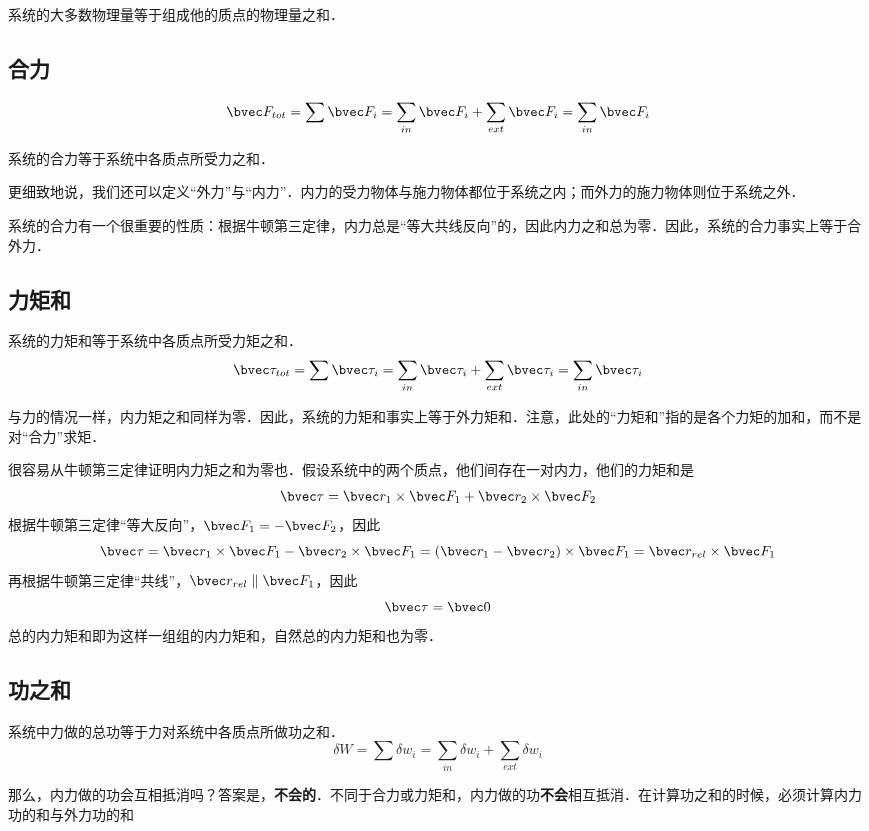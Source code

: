

系统的大多数物理量等于组成他的质点的物理量之和．
\subsection{合力}
\begin{equation}
\bvec F_{tot}=\sum \bvec F_i=\sum_{in} \bvec F_i + \sum_{ext} \bvec F_i = \sum_{in} \bvec F_i
\end{equation}

系统的合力等于系统中各质点所受力之和．

更细致地说，我们还可以定义“外力”与“内力”．内力的受力物体与施力物体都位于系统之内；而外力的施力物体则位于系统之外．

系统的合力有一个很重要的性质：根据牛顿第三定律，内力总是“等大共线反向”的，因此内力之和总为零．因此，系统的合力事实上等于合外力．

\subsection{力矩和}
系统的力矩和等于系统中各质点所受力矩之和．
\begin{equation}
\bvec \tau_{tot}=\sum \bvec \tau_i=\sum_{in} \bvec \tau_i + \sum_{ext} \bvec \tau_i = \sum_{in} \bvec \tau_i
\end{equation}

与力的情况一样，内力矩之和同样为零．因此，系统的力矩和事实上等于外力矩和．注意，此处的“力矩和”指的是各个力矩的加和，而不是对“合力”求矩．

很容易从牛顿第三定律证明内力矩之和为零也．假设系统中的两个质点，他们间存在一对内力，他们的力矩和是
$$\bvec \tau = \bvec r_1 \times \bvec F_1 + \bvec r_2 \times \bvec F_2$$
根据牛顿第三定律“等大反向”，$\bvec F_1=-\bvec F_2$，因此
$$\bvec \tau = \bvec r_1 \times \bvec F_1 - \bvec r_2 \times \bvec F_1 = (\bvec r_1 - \bvec r_2) \times \bvec F_1 = \bvec r_{rel}\times \bvec F_1$$
再根据牛顿第三定律“共线”，$\bvec r_{rel} \parallel \bvec F_1 $，因此
$$\bvec \tau = \bvec 0$$
总的内力矩和即为这样一组组的内力矩和，自然总的内力矩和也为零．

\subsection{功之和}
系统中力做的总功等于力对系统中各质点所做功之和．
\begin{equation}
\delta W = \sum \delta w_i = \sum_{in} \delta w_i + \sum_{ext} \delta w_i
\end{equation}

那么，内力做的功会互相抵消吗？答案是，\textbf{不会的}．不同于合力或力矩和，内力做的功\textbf{不会}相互抵消．在计算功之和的时候，必须计算内力功的和与外力功的和
